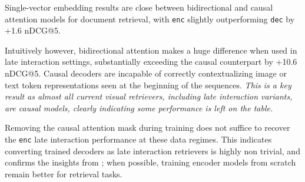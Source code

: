 Single-vector embedding results are close between bidirectional and causal attention models for document retrieval, with \texttt{enc} slightly outperforming \texttt{dec} by +1.6 nDCG@5. 

Intuitively however, bidirectional attention makes a huge difference when used in late interaction settings, substantially exceeding the causal counterpart by +10.6 nDCG@5. 
Causal decoders are incapable of correctly contextualizing image or text token representations seen at the beginning of the sequences. \textit{This is a key result as almost all current visual retrievers, including late interaction variants, are causal models, clearly indicating some performance is left on the table.}

Removing the causal attention mask during training does not suffice to recover the \texttt{enc} late interaction performance at these data regimes. This indicates converting trained decoders as late interaction retrievers is highly non trivial, and confirms the insights from \citet{weller2025seqvsseqopen}; when possible, training encoder models from scratch remain better for retrieval tasks.



    
